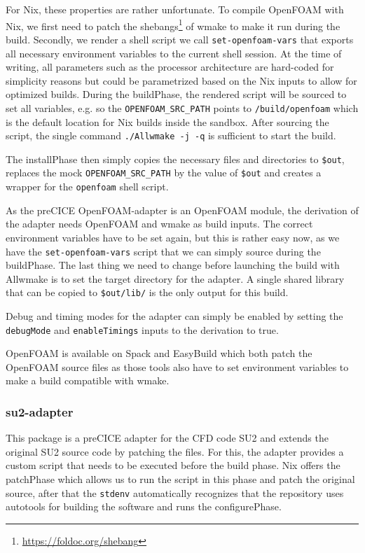 \documentclass[conference,final,a4paper]{IEEEtran}
\begin{document}
For Nix, these properties are rather unfortunate.
To compile OpenFOAM with Nix, we first need to patch the shebangs\footnote{\url{https://foldoc.org/shebang}} of wmake to make it run during the build.
Secondly, we render a shell script we call \texttt{set-openfoam-vars} that exports all necessary environment variables to the current shell session.
At the time of writing, all parameters such as the processor architecture are hard-coded for simplicity reasons but could be parametrized based on the Nix inputs to allow for optimized builds.
During the buildPhase, the rendered script will be sourced to set all variables, e.g. so the \texttt{OPENFOAM\_SRC\_PATH} points to \texttt{/build/openfoam} which is the default location for Nix builds inside the sandbox.
After sourcing the script, the single command \texttt{./Allwmake -j -q} is sufficient to start the build.

The installPhase then simply copies the necessary files and directories to \texttt{\$out}, replaces the mock \texttt{OPENFOAM\_SRC\_PATH} by the value of \texttt{\$out} and creates a wrapper for the \texttt{openfoam} shell script.

As the preCICE OpenFOAM-adapter is an OpenFOAM module, the derivation of the adapter needs OpenFOAM and wmake as build inputs.
The correct environment variables have to be set again, but this is rather easy now, as we have the \texttt{set-openfoam-vars} script that we can simply source during the buildPhase.
The last thing we need to change before launching the build with Allwmake is to set the target directory for the adapter.
A single shared library that can be copied to \texttt{\$out/lib/} is the only output for this build.

Debug and timing modes for the adapter can simply be enabled by setting the \texttt{debugMode} and \texttt{enableTimings} inputs to the derivation to true.

OpenFOAM is available on Spack and EasyBuild which both patch the OpenFOAM source files as those tools also have to set environment variables to make a build compatible with wmake.\\

\subsubsection{su2-adapter}

This package is a preCICE adapter for the CFD code SU2 and extends the original SU2 source code by patching the files.
For this, the adapter provides a custom script that needs to be executed before the build phase.
Nix offers the patchPhase which allows us to run the script in this phase and patch the original source, after that the \texttt{stdenv} automatically recognizes that the repository uses autotools for building the software and runs the configurePhase.
\end{document}
